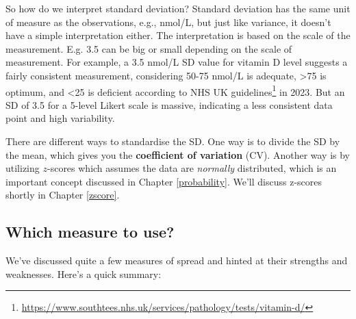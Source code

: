\documentclass[
]{book}
\theoremstyle{definition}
\theoremstyle{definition}
\theoremstyle{definition}
\theoremstyle{definition}
\theoremstyle{remark}
\begin{document}
So how do we interpret standard deviation? Standard deviation has the same unit of measure as the observations, e.g., nmol/L, but just like variance, it doesn't have a simple interpretation either. The interpretation is based on the scale of the measurement. E.g. 3.5 can be big or small depending on the scale of measurement. For example, a 3.5 nmol/L SD value for vitamin D level suggests a fairly consistent measurement, considering 50-75 nmol/L is adequate, \textgreater75 is optimum, and \textless25 is deficient according to NHS UK guidelines\footnote{\url{https://www.southtees.nhs.uk/services/pathology/tests/vitamin-d/}} in 2023. But an SD of 3.5 for a 5-level Likert scale is massive, indicating a less consistent data point and high variability.

There are different ways to standardise the SD. One way is to divide the SD by the mean, which gives you the \textbf{coefficient of variation} (CV). Another way is by utilizing \(z\)-scores which assumes the data are \emph{normally} distributed, which is an important concept discussed in Chapter \ref{probability}. We'll discuss z-scores shortly in Chapter \ref{zscore}.

\hypertarget{which-measure-to-use}{%
\subsection{Which measure to use?}\label{which-measure-to-use}}

We've discussed quite a few measures of spread and hinted at their strengths and weaknesses. Here's a quick summary:
\end{document}
